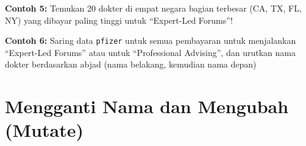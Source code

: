 \documentclass[
]{book}
\newenvironment{Shaded}{\begin{snugshade}}{\end{snugshade}}
\newcommand{\DecValTok}[1]{\textcolor[rgb]{0.00,0.00,0.81}{#1}}
\newcommand{\KeywordTok}[1]{\textcolor[rgb]{0.13,0.29,0.53}{\textbf{#1}}}
\newcommand{\NormalTok}[1]{#1}
\newcommand{\OperatorTok}[1]{\textcolor[rgb]{0.81,0.36,0.00}{\textbf{#1}}}
\newcommand{\StringTok}[1]{\textcolor[rgb]{0.31,0.60,0.02}{#1}}
\begin{document}
\textbf{Contoh 5:} Temukan 20 dokter di empat negara bagian terbesar (CA, TX, FL, NY) yang dibayar paling tinggi untuk ``Expert-Led Forums''!

\begin{Shaded}
\end{Shaded}

\textbf{Contoh 6:} Saring data \texttt{pfizer} untuk semua pembayaran untuk menjalankan ``Expert-Led Forums'' atau untuk ``Professional Advising'', dan urutkan nama dokter berdasarkan abjad (nama belakang, kemudian nama depan)

\begin{Shaded}
\end{Shaded}

\hypertarget{mengganti-nama-dan-mengubah-mutate}{%
\section{Mengganti Nama dan Mengubah (Mutate)}\label{mengganti-nama-dan-mengubah-mutate}}
\end{document}
